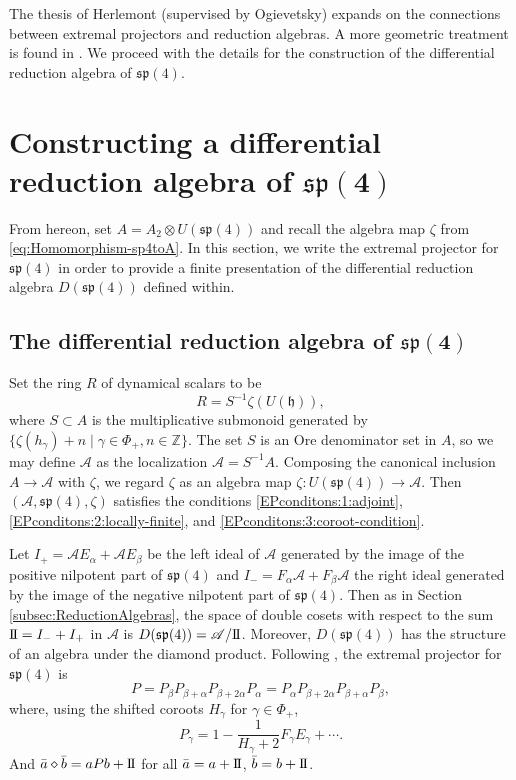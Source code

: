 \documentclass[10pt,a4paper]{amsart}
\numberwithin{equation}{section}
\newcommand{\II}{\mathrm{I\hspace{-.1em}I}}
\begin{document}
The thesis \cite{herlemontDifferentialCalculusMathbf2017} of Herlemont (supervised by Ogievetsky) expands on the connections between extremal projectors and reduction algebras. A more geometric treatment is found in \cite{sevostyanovGeometricMeaningZhelobenko2013}. We proceed with the details for the construction of the differential reduction algebra of $\mathfrak{sp}(4)$.


\section[Constructing a differential reduction algebra of sp(4)]{Constructing a differential reduction algebra of $\boldsymbol{\mathfrak{sp}(4)}$}\label{sec:sp4reduction}
From hereon, set $A = A_{2} \otimes U(\mathfrak{sp}(4))$ and recall the algebra map $\zeta$ from \eqref{eq:Homomorphism-sp4toA}. In this section, we write the extremal projector for $\mathfrak{sp}(4)$ in order to provide a finite presentation of the differential reduction algebra $D(\mathfrak{sp}(4))$ defined within.

\subsection[The differential reduction algebra of sp(4)]{The differential reduction algebra of $\boldsymbol{\mathfrak{sp}(4)}$}\label{subsec:DRAsp4}

Set the ring $R$ of dynamical scalars to be
\begin{equation}\label{eq:R-ring-of-dynamical-scalars}
	R=S^{-1}\zeta(U(\mathfrak{h})),
\end{equation}
where $S\subset A$ is the multiplicative submonoid generated by
$\{\zeta(h_\gamma)+n\mid \gamma\in\Phi_+, n \in \mathbb{Z}\}$. The set $S$ is an Ore denominator set in $A$, so we may define $\mathscr{A}$ as the localization
$\mathscr{A} = S^{-1}A$.
Composing the canonical inclusion $A\to\mathscr{A}$ with $\zeta$, we regard $\zeta$ as an algebra map $\zeta\colon U(\mathfrak{sp}(4))\to\mathscr{A}$.
Then~$(\mathscr{A},\mathfrak{sp}(4),\zeta)$ satisfies the conditions \ref{EPconditons:1:adjoint}, \ref{EPconditons:2:locally-finite}, and \ref{EPconditons:3:coroot-condition}.

Let
$I_+ = \mathscr{A}E_\alpha+\mathscr{A}E_\beta$
be the left ideal of $\mathscr{A}$ generated by the image of the positive nilpotent part of $\mathfrak{sp}(4)$ and $I_-=F_\alpha\mathscr{A}+F_\beta\mathscr{A}$ the right ideal generated by the image of the negative nilpotent part of $\mathfrak{sp}(4)$. Then as in Section \ref{subsec:ReductionAlgebras}, the space of double cosets with respect to the sum $\II=I_-+I_+$ in $\mathscr{A}$ is
$D(\mathfrak{sp}(4))=\mathscr{A}/\II$.
Moreover, $D(\mathfrak{sp}(4))$ has the structure of an algebra under the diamond product. Following \cite[Theorem 2]{zhelobenkoExtremalProjectorsGeneralized1989}, the extremal projector for $\mathfrak{sp}(4)$ is
\[
	P=P_\beta P_{\beta+\alpha}P_{\beta+2\alpha}P_\alpha = P_\alpha P_{\beta+2\alpha}P_{\beta+\alpha}P_{\beta},
\]
where, using the shifted coroots $H_\gamma$ for $\gamma \in \Phi_{+}$,
\[
	P_\gamma = 1-\frac{1}{H_\gamma+2}F_\gamma E_\gamma + \cdots.
\]
And
$\bar a\diamond \bar b = aPb + \II$ for all $\bar a=a+\II$, $ \bar b=b+\II$.
\end{document}
